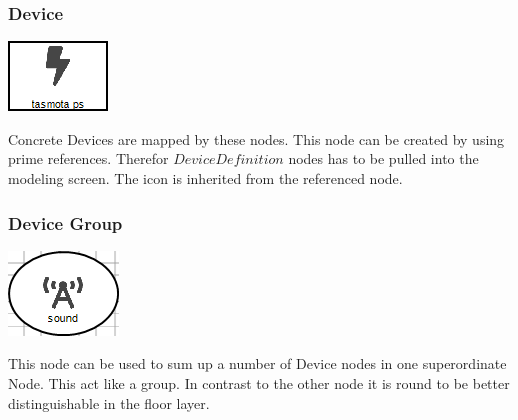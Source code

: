 \subsubsection{Device}
\noindent\begin{minipage}{0.15\textwidth}%
	\includegraphics[width=\linewidth]{assets/images/sensor}
\end{minipage}%
\hfill%
\begin{minipage}{0.8\textwidth}
	Concrete Devices are mapped by these nodes. This node can be created by using prime references. Therefor $DeviceDefinition$ nodes has to be pulled into the modeling screen. The icon is inherited from the referenced node.
\end{minipage}

\subsubsection{Device Group}
\noindent\begin{minipage}{0.15\textwidth}%
	\includegraphics[width=\linewidth]{assets/images/group}
\end{minipage}%
\hfill%
\begin{minipage}{0.8\textwidth}
	This node can be used to sum up a number of Device nodes in one superordinate Node. This act like a group. In contrast to the other node it is round to be better distinguishable in the floor layer.
\end{minipage}


